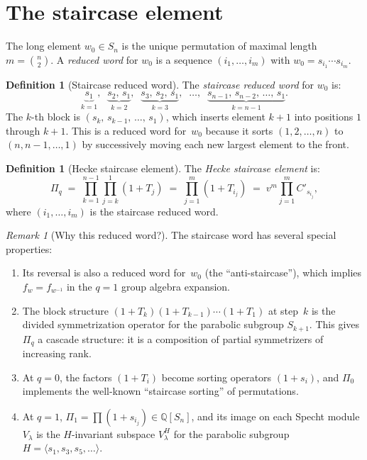 \documentclass[11pt]{article}
\theoremstyle{definition}
\newtheorem{definition}[theorem]{Definition}
\theoremstyle{remark}
\newtheorem{remark}[theorem]{Remark}
\begin{document}
\section{The staircase element}\label{sec:staircase}

The long element $w_0 \in S_n$ is the unique permutation of maximal
length $m = \binom{n}{2}$.  A \emph{reduced word} for $w_0$ is a
sequence $(i_1, \ldots, i_m)$ with
$w_0 = s_{i_1} \cdots s_{i_m}$.

\begin{definition}[Staircase reduced word]
The \emph{staircase reduced word} for $w_0$ is:
\[
  \underbrace{s_1}_{k=1},\;\;
  \underbrace{s_2,\, s_1}_{k=2},\;\;
  \underbrace{s_3,\, s_2,\, s_1}_{k=3},\;\;
  \ldots,\;\;
  \underbrace{s_{n-1},\, s_{n-2},\, \ldots,\, s_1}_{k=n-1}.
\]
The $k$-th block is $(s_k,\, s_{k-1},\, \ldots,\, s_1)$, which
inserts element $k+1$ into positions $1$ through $k+1$.
This is a reduced word for~$w_0$ because it sorts
$(1, 2, \ldots, n)$ to $(n, n{-}1, \ldots, 1)$ by successively
moving each new largest element to the front.
\end{definition}

\begin{definition}[Hecke staircase element]
The \emph{Hecke staircase element} is:
\[
  \Pi_q \;=\; \prod_{k=1}^{n-1} \prod_{j=k}^{1} (1 + T_j)
  \;=\; \prod_{j=1}^{m} (1 + T_{i_j})
  \;=\; v^m \prod_{j=1}^{m} C'_{s_{i_j}},
\]
where $(i_1, \ldots, i_m)$ is the staircase reduced word.
\end{definition}

\begin{remark}[Why this reduced word?]
The staircase word has several special properties:
\begin{enumerate}
\item Its reversal is also a reduced word for~$w_0$
  (the ``anti-staircase''), which implies $f_w = f_{w^{-1}}$
  in the $q = 1$ group algebra expansion.
\item The block structure
  $(1 + T_k)(1 + T_{k-1}) \cdots (1 + T_1)$ at step~$k$
  is the divided symmetrization operator for the parabolic
  subgroup $S_{k+1}$.
  This gives $\Pi_q$ a cascade structure: it is a composition
  of partial symmetrizers of increasing rank.
\item At $q = 0$, the factors $(1 + T_i)$ become sorting operators
  $(1 + s_i)$, and $\Pi_0$ implements the well-known
  ``staircase sorting'' of permutations.
\item At $q = 1$, $\Pi_1 = \prod (1 + s_{i_j}) \in \mathbb{Q}[S_n]$,
  and its image on each Specht module $V_\lambda$ is the
  $H$-invariant subspace $V_\lambda^H$ for the parabolic
  subgroup $H = \langle s_1, s_3, s_5, \ldots \rangle$.
\end{enumerate}
\end{remark}
\end{document}
